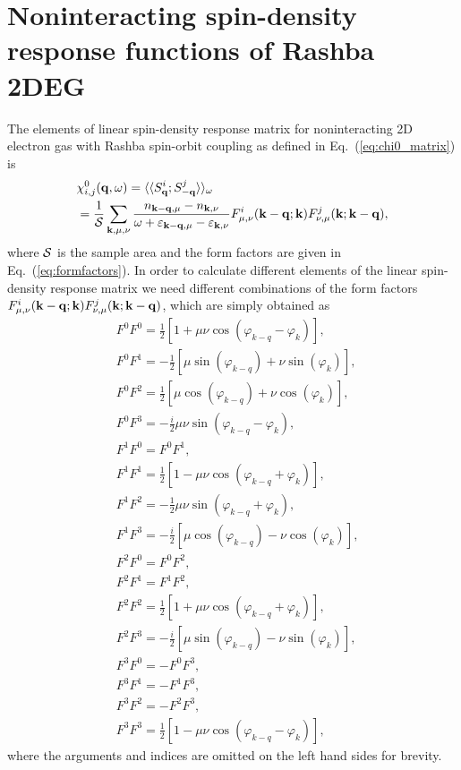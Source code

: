 \documentclass[aps, pra, reprint,superscriptaddress]{revtex4-1}
\def\be{\begin{equation}}
\def\ee{\end{equation}}
\def\kv{{\bf k}}
\def\qv{{\bf q}}
\begin{document}
\section{Noninteracting spin-density response functions of Rashba 2DEG}\label{app:rashba}
The elements of linear spin-density response matrix for noninteracting 2D electron gas with Rashba spin-orbit coupling as defined in Eq.~(\ref{eq:chi0_matrix}) is
\be
\begin{split}
&\chi^{0}_{i,j}(\qv,\omega)=\langle\langle  S^{i}_{\qv}; S^{j}_{-\qv}\rangle\rangle_\omega \\
&=\frac{1}{{\cal S}}\sum_{\kv,\mu,\nu} 
\frac{n_{\kv-\qv,\mu}-n_{\kv,\nu}}{\omega +\varepsilon_{\kv-\qv,\mu}-\varepsilon_{\kv,\nu}}
F^{i}_{\mu,\nu}(\kv-\qv;\kv)F^{j}_{\nu,\mu}(\kv;\kv-\qv),
\end{split}
\ee
where ${\cal S}$ is the sample area and the form factors are given in Eq.~(\ref{eq:formfactors}). In order to calculate different elements of the linear spin-density response matrix we need different combinations of the form factors $F^{i}_{\mu,\nu}(\kv-\qv;\kv)F^{j}_{\nu,\mu}(\kv;\kv-\qv)$, which are simply obtained as  
\be\label{eq:product_of_formfactors}
\begin{split}
&F^{0}F^{0}=\frac{1}{2}\left[1+\mu \nu \cos(\varphi_{k-q}-\varphi_{k}) \right],\\
&F^{0}F^{1}=-\frac{1}{2}\left[\mu \sin(\varphi_{k-q})+\nu \sin(\varphi_{k})\right],\\
&F^{0}F^{2}=\frac{1}{2}\left[\mu \cos(\varphi_{k-q})+ \nu \cos(\varphi_{k}) \right],\\
&F^{0}F^{3}=-\frac{i}{2}\mu \nu \sin(\varphi_{k-q}-\varphi_{k}),\\
&F^{1}F^{0}=F^{0}F^{1},\\
&F^{1}F^{1}=\frac{1}{2}\left[1-\mu \nu \cos(\varphi_{k-q}+\varphi_{k}) \right],\\
&F^{1}F^{2}=-\frac{1}{2}\mu \nu \sin(\varphi_{k-q}+\varphi_{k}),\\
&F^{1}F^{3}=-\frac{i}{2}\left[\mu \cos(\varphi_{k-q})- \nu \cos(\varphi_{k}) \right],\\
&F^{2}F^{0}=F^{0}F^{2},\\
&F^{2}F^{1}=F^{1}F^{2},\\
&F^{2}F^{2}=\frac{1}{2}\left[1+\mu \nu \cos(\varphi_{k-q}+\varphi_{k}) \right],\\
&F^{2}F^{3}=-\frac{i}{2}\left[\mu \sin(\varphi_{k-q})-\nu \sin(\varphi_{k})\right],\\
&F^{3}F^{0}=-F^{0}F^{3},\\
&F^{3}F^{1}=-F^{1}F^{3},\\
&F^{3}F^{2}=-F^{2}F^{3},\\
&F^{3}F^{3}=\frac{1}{2}\left[1-\mu \nu \cos(\varphi_{k-q}-\varphi_{k}) \right],
\end{split}
\ee
where the arguments and indices are omitted on the left hand sides for brevity. 
 
\end{document}
